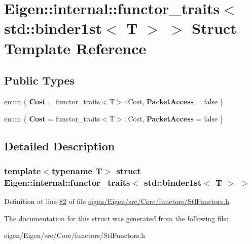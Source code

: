 \hypertarget{struct_eigen_1_1internal_1_1functor__traits_3_01std_1_1binder1st_3_01_t_01_4_01_4}{}\section{Eigen\+:\+:internal\+:\+:functor\+\_\+traits$<$ std\+:\+:binder1st$<$ T $>$ $>$ Struct Template Reference}
\label{struct_eigen_1_1internal_1_1functor__traits_3_01std_1_1binder1st_3_01_t_01_4_01_4}
\subsection*{Public Types}
\begin{DoxyCompactItemize}
\item 
\mbox{\label{struct_eigen_1_1internal_1_1functor__traits_3_01std_1_1binder1st_3_01_t_01_4_01_4_a7065c70e1152d22de1e45b8e6e41c69f}} 
enum \{ {\bfseries Cost} = functor\+\_\+traits$<$T$>$\+:\+:Cost, 
{\bfseries Packet\+Access} = false
 \}
\item 
\mbox{\label{struct_eigen_1_1internal_1_1functor__traits_3_01std_1_1binder1st_3_01_t_01_4_01_4_a6b9cc5372a2acd62e431bda058edb33b}} 
enum \{ {\bfseries Cost} = functor\+\_\+traits$<$T$>$\+:\+:Cost, 
{\bfseries Packet\+Access} = false
 \}
\end{DoxyCompactItemize}


\subsection{Detailed Description}
\subsubsection*{template$<$typename T$>$\newline
struct Eigen\+::internal\+::functor\+\_\+traits$<$ std\+::binder1st$<$ T $>$ $>$}



Definition at line \hyperlink{eigen_2_eigen_2src_2_core_2functors_2_stl_functors_8h_source_l00082}{82} of file \hyperlink{eigen_2_eigen_2src_2_core_2functors_2_stl_functors_8h_source}{eigen/\+Eigen/src/\+Core/functors/\+Stl\+Functors.\+h}.



The documentation for this struct was generated from the following file\+:\begin{DoxyCompactItemize}
\item 
eigen/\+Eigen/src/\+Core/functors/\+Stl\+Functors.\+h\end{DoxyCompactItemize}
